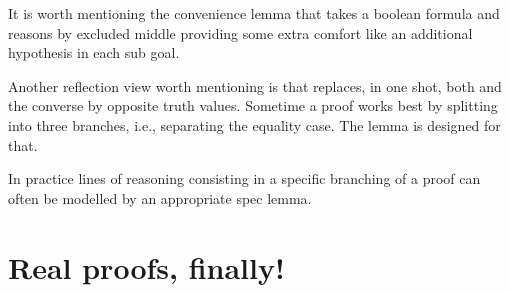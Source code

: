 It is worth mentioning the convenience lemma  that takes a boolean
formula and reasons by excluded middle providing some extra comfort
like an additional hypothesis in each sub goal.

Another reflection view worth mentioning is  that replaces, in one shot,
both \C{(_ <= _)} and the converse \C{(_ < _)} by opposite truth values.
Sometime a proof works best by splitting into three branches, i.e.,
separating the equality case. The  lemma is designed for that.

In practice lines of reasoning consisting in a specific branching of
a proof can often be modelled by an appropriate spec lemma.






\clearpage
\section{Real proofs, finally!}\label{sec:realproofs}

